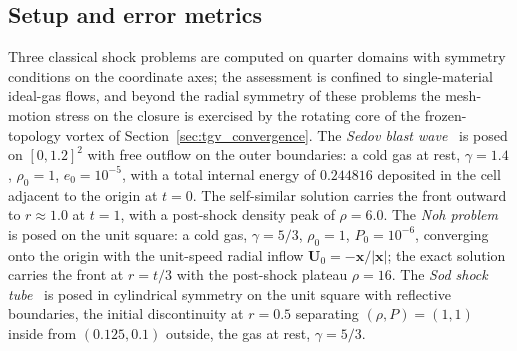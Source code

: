 \documentclass[a4paper]{cas-sc}
\begin{document}
\subsection{Setup and error metrics}
\label{sec:numerics_metrics}

Three classical shock problems are computed on quarter domains with symmetry conditions on the coordinate axes; the assessment is confined to single-material ideal-gas flows, and beyond the radial symmetry of these problems the mesh-motion stress on the closure is exercised by the rotating core of the frozen-topology vortex of Section~\ref{sec:tgv_convergence}. The \emph{Sedov blast wave}~\cite{sedov1959similarity,kamm2007efficient} is posed on $[0,1.2]^2$ with free outflow on the outer boundaries: a cold gas at rest, $\gamma=1.4$, $\rho_0=1$, $e_0=10^{-5}$, with a total internal energy of $0.244816$ deposited in the cell adjacent to the origin at $t=0$. The self-similar solution carries the front outward to \(r\approx1.0\) at \(t=1\), with a post-shock density peak of \(\rho=6.0\). The \emph{Noh problem}~\cite{noh1987errors} is posed on the unit square: a cold gas, $\gamma=5/3$, $\rho_0=1$, $P_0=10^{-6}$, converging onto the origin with the unit-speed radial inflow $\boldsymbol U_0=-\boldsymbol x/|\boldsymbol x|$; the exact solution carries the front at $r=t/3$ with the post-shock plateau $\rho=16$. The \emph{Sod shock tube}~\cite{sod1978survey} is posed in cylindrical symmetry on the unit square with reflective boundaries, the initial discontinuity at $r=0.5$ separating $(\rho,P)=(1,1)$ inside from $(0.125,0.1)$ outside, the gas at rest, $\gamma=5/3$.
\end{document}
